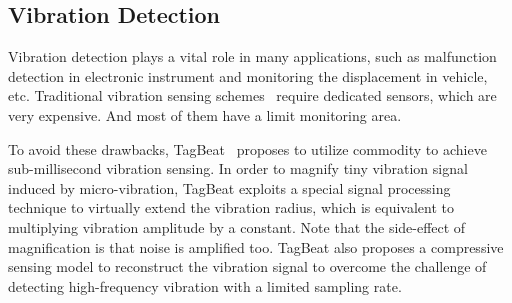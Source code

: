 \subsection{Vibration Detection}   Vibration detection plays a vital role in many applications, such as malfunction detection in electronic instrument and
monitoring the displacement in vehicle, etc. Traditional vibration sensing schemes~\cite{Lion} require dedicated sensors, which are very expensive. And
most of them have a limit monitoring area.

To avoid these drawbacks, TagBeat~\cite{Tagbeat} proposes to utilize commodity \RFID to achieve sub-millisecond vibration sensing. In order
to magnify tiny vibration signal induced by micro-vibration, TagBeat exploits a special signal processing technique to virtually
extend the vibration radius, which is equivalent to multiplying vibration amplitude by a constant. Note that the side-effect of magnification is that noise is amplified
too. TagBeat also proposes a compressive sensing model to reconstruct the vibration signal to overcome the challenge of detecting high-frequency vibration with a limited sampling rate.

